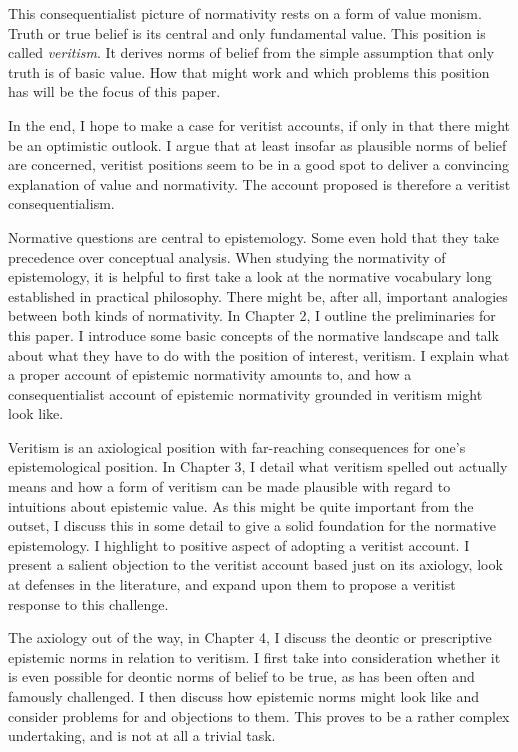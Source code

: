 \documentclass[12pt,numbers=noenddot]{scrartcl}
\begin{document}
This consequentialist picture of normativity rests on a form of value monism. Truth or true belief is its central and only fundamental value. This position is called \emph{veritism}. It derives norms of belief from the simple assumption that only truth is of basic value. How that might work and which problems this position has will be the focus of this paper.

In the end, I hope to make a case for veritist accounts, if only in that there might be an optimistic outlook. I argue that at least insofar as plausible norms of belief are concerned, veritist positions seem to be in a good spot to deliver a convincing explanation of value and normativity. The account proposed is therefore a veritist consequentialism.

Normative questions are central to epistemology. Some even hold that they take precedence over conceptual analysis. When studying the normativity of epistemology, it is helpful to first take a look at the normative vocabulary long established in practical philosophy. There might be, after all, important analogies between both kinds of normativity. In Chapter 2, I outline the preliminaries for this paper. I introduce some basic concepts of the normative landscape and talk about what they have to do with the position of interest, veritism. I explain what a proper account of epistemic normativity amounts to, and how a consequentialist account of epistemic normativity grounded in veritism might look like.

Veritism is an axiological position with far-reaching consequences for one's epistemological position. In Chapter 3, I detail what veritism spelled out actually means and how a form of veritism can be made plausible with regard to intuitions about epistemic value. As this might be quite important from the outset, I discuss this in some detail to give a solid foundation for the normative epistemology. I highlight to positive aspect of adopting a veritist account. I present a salient objection to the veritist account based just on its axiology, look at defenses in the literature, and expand upon them to propose a veritist response to this challenge.

The axiology out of the way, in Chapter 4, I discuss the deontic or prescriptive epistemic norms in relation to veritism. I first take into consideration whether it is even possible for deontic norms of belief to be true, as has been often and famously challenged. I then discuss how epistemic norms might look like and consider problems for and objections to them. This proves to be a rather complex undertaking, and is not at all a trivial task.
\end{document}
